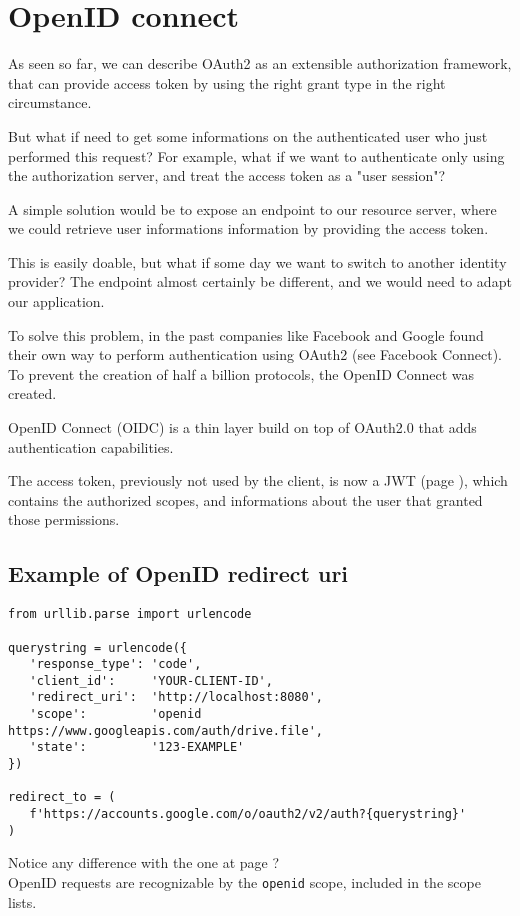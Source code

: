 \section{OpenID connect}
\label{openid}
As seen so far, we can describe OAuth2 as an extensible authorization
framework, that can provide access token by using the right grant type in the
right circumstance.

But what if need to get some informations on the authenticated user who just
performed this request?
For example, what if we want to authenticate only using the authorization
server, and treat the access token as a "user session"?

A simple solution would be to expose an endpoint to our resource server, where
we could retrieve user informations information by providing the access token.

This is easily doable, but what if some day we want to switch to another identity provider?
The endpoint almost certainly be different, and we would need to adapt our
application.


To solve this problem, in the past companies like
Facebook  and Google found their own way to perform authentication using OAuth2
(see Facebook Connect).
To prevent the creation of half a billion protocols, the OpenID Connect
was created.

OpenID Connect (OIDC) is a thin layer build on top of OAuth2.0 that adds
authentication capabilities.


The access token, previously not used by the client, is now a JWT (page
\pageref{jwt}), which contains the authorized scopes, and informations about the
user that granted those permissions.

\subsection{Example of OpenID redirect uri}

\begin{lstlisting}
from urllib.parse import urlencode

querystring = urlencode({
   'response_type': 'code',
   'client_id':     'YOUR-CLIENT-ID',
   'redirect_uri':  'http://localhost:8080',
   'scope':         'openid https://www.googleapis.com/auth/drive.file',
   'state':         '123-EXAMPLE'
})

redirect_to = (
   f'https://accounts.google.com/o/oauth2/v2/auth?{querystring}'
)
\end{lstlisting}
Notice any difference with the one at page \pageref{lst:authorization-code}?
\\
OpenID requests are recognizable by the \texttt{openid} scope, included in the
scope lists.

